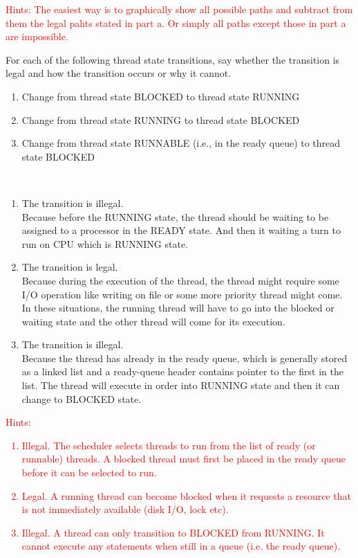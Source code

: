 \documentclass[12pt]{article}
\newenvironment{sol}[1][Solution]{\begin{trivlist}\item[\hskip\labelsep {\bfseries #1:}]}{\end{trivlist}}
\begin{document}
\begin{enumerate}
\begin{sol}
\end{sol}
\textcolor{red}{Hints: The easiest way is to graphically show all possible paths and subtract from them the legal pahts stated in part a. Or simply all paths except those in part a are impossible.}

\newpage
\item For each of the following thread state transitions, say whether the transition is legal and how the transition occurs or why it cannot.
\begin{enumerate}
    \item Change from thread state BLOCKED to thread state RUNNING
    \item Change from thread state RUNNING to thread state BLOCKED
    \item Change from thread state RUNNABLE (i.e., in the ready queue) to thread state BLOCKED
\end{enumerate}
\begin{sol}
    ~\
    \begin{enumerate}
        \item The transition is illegal.\\
        Because before the RUNNING state, the thread should be waiting to be assigned to a processor in the READY state. And then it waiting a turn to run on CPU which is RUNNING state.
        \item The transition is legal.\\
        Because during the execution of the thread, the thread might require some I/O operation like writing on file or some more priority thread might come. In these situations, the running thread will have to go into the blocked or waiting state and the other thread will come for its execution. 
        \item The transition is illegal.\\
        Because the thread has already in the ready queue, which is generally stored as a linked list and a ready-queue header contains pointer to the first in the list. The thread will execute in order into RUNNING state and then it can change to BLOCKED state.
    \end{enumerate}
\end{sol}
\textcolor{red}{Hints:
\begin{enumerate}
    \item[(a)] Illegal. The scheduler selects threads to run from the list of ready (or runnable) threads. A blocked thread must first be placed in the ready queue before it can be selected to run. 
    \item[(b)] Legal. A running thread can become blocked when it requests a resource that is not immediately available (disk I/O, lock etc).
    \item[(c)] Illegal. A thread can only transition to BLOCKED from RUNNING. It cannot execute any statements when still in a queue (i.e. the ready queue).
\end{enumerate}}


\end{enumerate}
\end{document}

